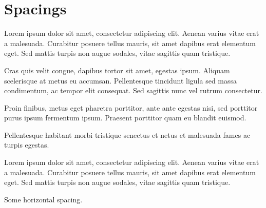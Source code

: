 \documentclass{article}
\begin{document}
\section*{Spacings}

\noindent Lorem ipsum dolor sit amet, consectetur adipiscing elit. Aenean varius
vitae erat a malesuada. Curabitur posuere tellus mauris, sit amet dapibus erat
elementum eget. Sed mattis turpis non augue sodales, vitae sagittis quam
tristique.

\smallskip

\noindent Cras quis velit congue, dapibus tortor sit amet, egestas ipsum.
Aliquam scelerisque at metus eu accumsan. Pellentesque tincidunt ligula sed
massa condimentum, ac tempor elit consequat. Sed sagittis nunc vel rutrum
consectetur.

\medskip

\noindent Proin finibus, metus eget pharetra porttitor, ante ante egestas
nisi, sed porttitor purus ipsum fermentum ipsum. Praesent porttitor quam eu
blandit euismod.

\bigskip

\noindent Pellentesque habitant morbi tristique senectus et netus et
malesuada fames ac turpis egestas.

\vspace{2em}

\noindent Lorem ipsum dolor sit amet, consectetur adipiscing elit. Aenean varius
vitae erat a malesuada. Curabitur posuere tellus mauris, sit amet dapibus erat
elementum eget. Sed mattis turpis non augue sodales, vitae sagittis quam
tristique.

\vspace{2em}

\noindent Some \hspace{2em} horizontal \hspace{2em} spacing.
\end{document}
